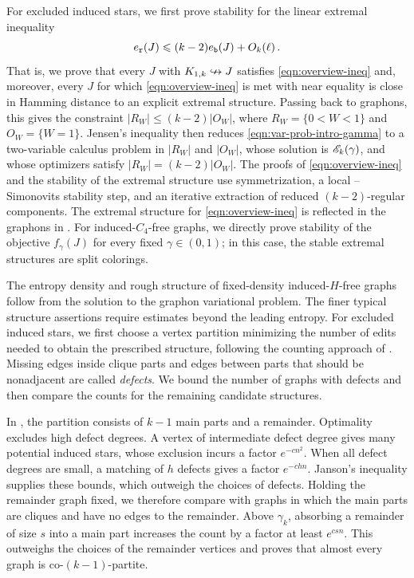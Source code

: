 For excluded induced stars, we first prove stability for the linear extremal inequality
\begin{equation}\label{eqn:overview-ineq}
e_{\normalfont\texttt r}(J)\leqslant (k-2)e_{\normalfont\texttt b}(J)+O_k(\ell)\,.
\end{equation}
That is, we prove that every $J$ with $K_{1,k}\nHookrightarrow J$ satisfies \eqref{eqn:overview-ineq} and, moreover, every $J$ for which \eqref{eqn:overview-ineq} is met with near equality is close in Hamming distance to an explicit extremal structure. Passing back to graphons, this gives the constraint $|R_W|\leq (k-2)|O_W|$, where $R_W=\{0<W<1\}$ and $O_W=\{W=1\}$. Jensen's inequality then reduces \eqref{eqn:var-prob-intro-gamma} to a two-variable calculus problem in $|R_W|$ and $|O_W|$, whose solution is ${\mathscr E}_k(\gamma)$, and whose optimizers satisfy $|R_W|=(k-2)|O_W|$. The proofs of \eqref{eqn:overview-ineq} and the stability of the extremal structure use symmetrization, a local \erdos{}--Simonovits stability step, and an iterative extraction of reduced $(k-2)$-regular components. The extremal structure for \eqref{eqn:overview-ineq} is reflected in the graphons in . For induced-$C_4$-free graphs, we directly prove stability of the objective $f_\gamma(J)$ for every fixed $\gamma\in(0,1)$; in this case, the stable extremal structures are split colorings.

The entropy density and rough structure of fixed-density induced-$H$-free graphs follow from the solution to the graphon variational problem. The finer typical structure assertions require estimates beyond the leading entropy. For excluded induced stars, we first choose a vertex partition minimizing the number of edits needed to obtain the prescribed structure, following the counting approach of \cite{balogh2020efficient,perkins2025typical}. Missing edges inside clique parts and edges between parts that should be nonadjacent are called \emph{defects}. We bound the number of graphs with defects and then compare the counts for the remaining candidate structures.

In , the partition consists of $k-1$ main parts and a remainder. Optimality excludes high defect degrees. A vertex of intermediate defect degree gives many potential induced stars, whose exclusion incurs a factor $e^{-cn^2}$. When all defect degrees are small, a matching of $h$ defects gives a factor $e^{-chn}$. Janson's inequality supplies these bounds, which outweigh the choices of defects. Holding the remainder graph fixed, we therefore compare with graphs in which the main parts are cliques and have no edges to the remainder. Above $\gamma_k$, absorbing a remainder of size $s$ into a main part increases the count by a factor at least $e^{csn}$. This outweighs the choices of the remainder vertices and proves that almost every graph is co-$(k-1)$-partite.

